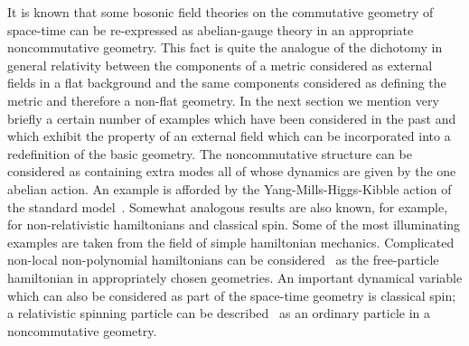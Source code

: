 \documentclass[a4paper,12pt]{article}
\begin{document}
It is known that some bosonic field theories on the commutative
geometry of space-time can be re-expressed as abelian-gauge theory in
an appropriate noncommutative geometry. This fact is quite the
analogue of the dichotomy in general relativity between the components
of a metric considered as external fields in a flat background and the
same components considered as defining the metric and therefore a
non-flat geometry. In the next section we mention very briefly a
certain number of examples which have been considered in the past and
which exhibit the property of an external field which can be
incorporated into a redefinition of the basic geometry.  The
noncommutative structure can be considered as containing extra modes
all of whose dynamics are given by the one abelian action. An example
is afforded by the Yang-Mills-Higgs-Kibble action of the standard
model~\cite{DubKerMad89a,ConLot90}.  Somewhat analogous results are also
known, for example, for non-relativistic hamiltonians and classical
spin.  Some of the most illuminating examples are taken from the field
of simple hamiltonian mechanics.  Complicated non-local non-polynomial
hamiltonians can be considered~\cite{SchWes92,Wes99} as the
free-particle hamiltonian in appropriately chosen geometries. An
important dynamical variable which can also be considered as part of
the space-time geometry is classical spin; a relativistic spinning
particle can be described~\cite{Mad89c} as an ordinary particle
in a noncommutative geometry.  
\end{document}
